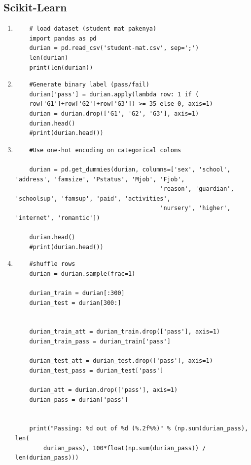 	\subsection{Scikit-Learn}
\begin{enumerate}

\item
\begin{verbatim}
	# load dataset (student mat pakenya)
	import pandas as pd
	durian = pd.read_csv('student-mat.csv', sep=';')
	len(durian)
	print(len(durian))
\end{verbatim}

\item
\begin{verbatim}
	#Generate binary label (pass/fail)
	durian['pass'] = durian.apply(lambda row: 1 if (
    row['G1']+row['G2']+row['G3']) >= 35 else 0, axis=1)
	durian = durian.drop(['G1', 'G2', 'G3'], axis=1)
	durian.head()
	#print(durian.head())
\end{verbatim}


\item
\begin{verbatim}
	#Use one-hot encoding on categorical coloms

	durian = pd.get_dummies(durian, columns=['sex', 'school', 'address', 'famsize', 'Pstatus', 'Mjob', 'Fjob',
                                         'reason', 'guardian', 'schoolsup', 'famsup', 'paid', 'activities',
                                         'nursery', 'higher', 'internet', 'romantic'])

	durian.head()
	#print(durian.head())
\end{verbatim}


\item
\begin{verbatim}
	#shuffle rows
	durian = durian.sample(frac=1)

	durian_train = durian[:300]
	durian_test = durian[300:]


	durian_train_att = durian_train.drop(['pass'], axis=1)
	durian_train_pass = durian_train['pass']

	durian_test_att = durian_test.drop(['pass'], axis=1)
	durian_test_pass = durian_test['pass']

	durian_att = durian.drop(['pass'], axis=1)
	durian_pass = durian['pass']


	print("Passing: %d out of %d (%.2f%%)" % (np.sum(durian_pass), len(
		durian_pass), 100*float(np.sum(durian_pass)) / len(durian_pass)))

\end{verbatim}



\end{enumerate}
